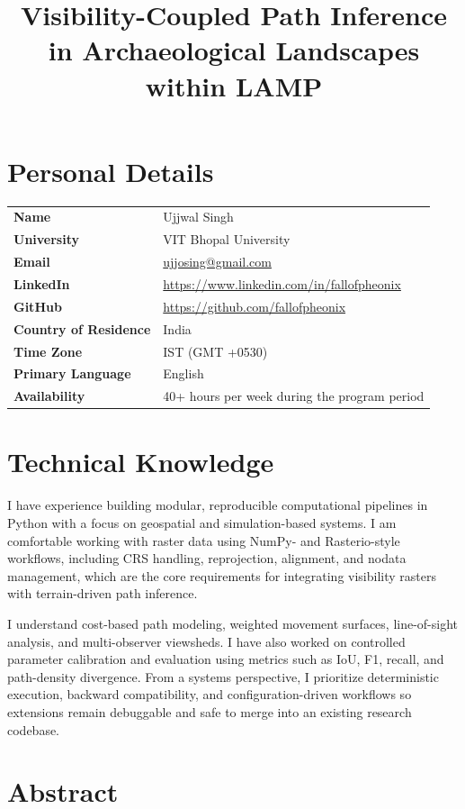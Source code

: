 \documentclass[11pt]{article}
\title{Visibility-Coupled Path Inference in Archaeological Landscapes within LAMP}
\author{}
\date{}
\let\oldsection\section
\renewcommand{\section}{\clearpage\oldsection}
\begin{document}
\maketitle

\section{Personal Details}

\begin{tabularx}{\textwidth}{@{}>{\bfseries}lX@{}}
Name & Ujjwal Singh \\
University & VIT Bhopal University \\
Email & \href{mailto:ujjosing@gmail.com}{ujjosing@gmail.com} \\
LinkedIn & \url{https://www.linkedin.com/in/fallofpheonix} \\
GitHub & \url{https://github.com/fallofpheonix} \\
Country of Residence & India \\
Time Zone & IST (GMT +0530) \\
Primary Language & English \\
Availability & 40+ hours per week during the program period \\
\end{tabularx}

\section{Technical Knowledge}

I have experience building modular, reproducible computational pipelines in Python with a focus on geospatial and simulation-based systems. I am comfortable working with raster data using NumPy- and Rasterio-style workflows, including CRS handling, reprojection, alignment, and nodata management, which are the core requirements for integrating visibility rasters with terrain-driven path inference.

I understand cost-based path modeling, weighted movement surfaces, line-of-sight analysis, and multi-observer viewsheds. I have also worked on controlled parameter calibration and evaluation using metrics such as IoU, F1, recall, and path-density divergence. From a systems perspective, I prioritize deterministic execution, backward compatibility, and configuration-driven workflows so extensions remain debuggable and safe to merge into an existing research codebase.

\section{Abstract}
\end{document}
